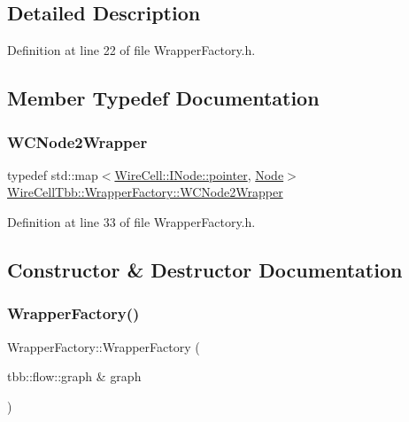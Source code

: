 \subsection{Detailed Description}


Definition at line 22 of file Wrapper\+Factory.\+h.



\subsection{Member Typedef Documentation}
\mbox{\label{class_wire_cell_tbb_1_1_wrapper_factory_abb90529b755ae886470769d8c46dc041}} 
\subsubsection{\texorpdfstring{W\+C\+Node2\+Wrapper}{WCNode2Wrapper}}
{\footnotesize\ttfamily typedef std\+::map$<$\hyperlink{class_wire_cell_1_1_interface_a09c548fb8266cfa39afb2e74a4615c37}{Wire\+Cell\+::\+I\+Node\+::pointer}, \hyperlink{namespace_wire_cell_tbb_aa7b6ff37a20e0174babf0614286bb59f}{Node}$>$ \hyperlink{class_wire_cell_tbb_1_1_wrapper_factory_abb90529b755ae886470769d8c46dc041}{Wire\+Cell\+Tbb\+::\+Wrapper\+Factory\+::\+W\+C\+Node2\+Wrapper}}



Definition at line 33 of file Wrapper\+Factory.\+h.



\subsection{Constructor \& Destructor Documentation}
\mbox{\label{class_wire_cell_tbb_1_1_wrapper_factory_a01283bcacef807e6fc326a7ec6c85b56}} 
\subsubsection{\texorpdfstring{Wrapper\+Factory()}{WrapperFactory()}}
{\footnotesize\ttfamily Wrapper\+Factory\+::\+Wrapper\+Factory (\begin{DoxyParamCaption}\item[{tbb\+::flow\+::graph \&}]{graph }\end{DoxyParamCaption})}



